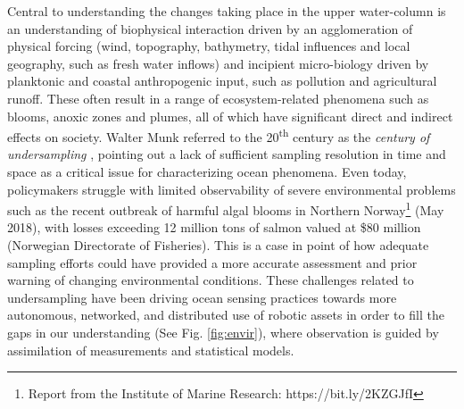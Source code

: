\documentclass[aoas]{imsart}
\begin{document}
Central to understanding the changes taking place in the upper
water-column is an understanding of biophysical interaction driven by
an agglomeration of physical forcing (wind, topography, bathymetry,
tidal influences and local geography, such as fresh water inflows)
and incipient micro-biology driven by planktonic and coastal
anthropogenic input, such as pollution and agricultural runoff. These
often result in a range of ecosystem-related phenomena such as blooms,
anoxic zones and plumes, all of which have significant direct and indirect effects  on society. Walter Munk referred to the
20\textsuperscript{th} century as the \emph{century of undersampling}
\citep{munk2002}, pointing out a lack of sufficient sampling
resolution in time and space as a critical issue for characterizing
ocean phenomena. Even today, policymakers struggle with limited
observability of severe environmental problems such as the recent outbreak of harmful algal blooms in Northern
Norway\footnote{Report from the Institute of Marine
  Research: https://bit.ly/2KZGJfI} (May 2018), with losses exceeding 12 million
tons of salmon valued at \$80 million (Norwegian Directorate of
Fisheries). This is a case in point of how adequate sampling efforts
could have provided a more accurate assessment and prior
warning of changing environmental conditions. These challenges related to undersampling have been driving
ocean sensing practices towards more autonomous, networked, and
distributed use of robotic assets in order to fill the gaps in our
understanding (See Fig. \ref{fig:envir}), where observation is
guided by assimilation of measurements and statistical models. 
\end{document}
